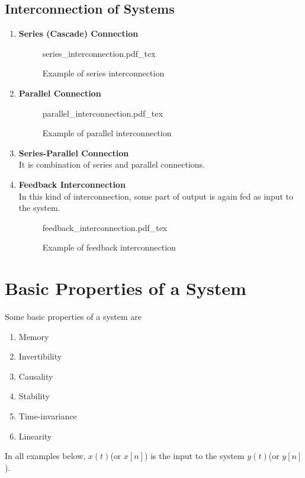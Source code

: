 \documentclass[oneside]{book}
\newcommand{\incfig}[1]{%
    {#1.pdf_tex}
}
\begin{document}
\subsection{Interconnection of Systems}
\begin{enumerate}
	\item \textbf{Series (Cascade) Connection}
	      \begin{figure}[ht]
		      \centering
		      \incfig{series_interconnection}
		      \caption{Example of series interconnection}
	      \end{figure}
	\item \textbf{Parallel Connection}
	      \begin{figure}[ht]
		      \centering
		      \incfig{parallel_interconnection}
		      \caption{Example of parallel interconnection}
	      \end{figure}
	\item \textbf{Series-Parallel Connection}\\
	      It is combination of series and parallel connections.
	\item \textbf{Feedback Interconnection}\\
	      In this kind of interconnection, some part of output is again fed as input to the system.
	      \begin{figure}[ht]
		      \centering
		      \incfig{feedback_interconnection}
		      \caption{Example of feedback interconnection}
	      \end{figure}
\end{enumerate}

\section{Basic Properties of a System}
Some basic properties of a system are
\begin{enumerate}
	\item Memory
	\item Invertibility
	\item Causality
	\item Stability
	\item Time-invariance
	\item Linearity
\end{enumerate}

In all examples below, $x(t)$(or $x[n]$) is the input to the system $y(t)$(or $y[n]$).
\end{document}
